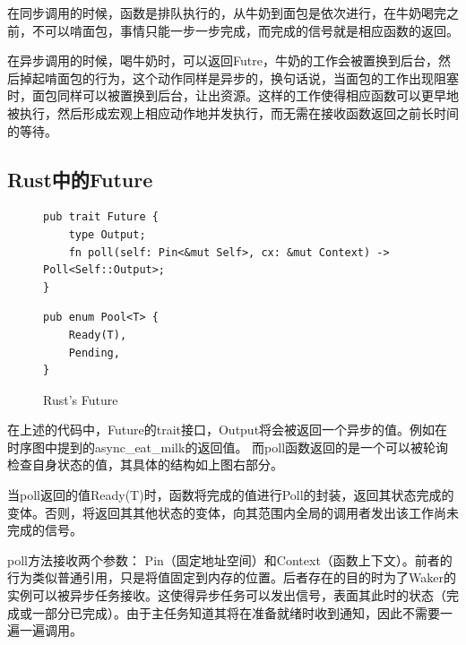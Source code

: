 在同步调用的时候，函数是排队执行的，从牛奶到面包是依次进行，在牛奶喝完之前，不可以啃面包，事情只能一步一步完成，而完成的信号就是相应函数的返回。


在异步调用的时候，喝牛奶时，可以返回Futre，牛奶的工作会被置换到后台，然后掉起啃面包的行为，这个动作同样是异步的，换句话说，当面包的工作出现阻塞时，面包同样可以被置换到后台，让出资源。这样的工作使得相应函数可以更早地被执行，然后形成宏观上相应动作地并发执行，而无需在接收函数返回之前长时间的等待。

\subsection{Rust中的Future}

\begin{figure}[htbp]
    \figureCapSet
	\centering
	\begin{minipage}{0.49\linewidth}%
		\centering
\begin{lstlisting}[frame=none]
pub trait Future {
    type Output;
    fn poll(self: Pin<&mut Self>, cx: &mut Context) -> Poll<Self::Output>;
}
\end{lstlisting}
	\end{minipage}
    \hfill
	\begin{minipage}{0.49\linewidth}
		\centering
        \begin{lstlisting}[frame=none]
pub enum Pool<T> {
    Ready(T),
    Pending,
}
        \end{lstlisting}
	\end{minipage}
    \caption{Rust's Future}
\end{figure}

在上述的代码中，Future的trait接口，Output将会被返回一个异步的值。例如在时序图中提到的async\_eat\_milk的返回值。 而poll函数返回的是一个可以被轮询检查自身状态的值，其具体的结构如上图右部分。 

当poll返回的值Ready(T)时，函数将完成的值进行Poll的封装，返回其状态完成的变体。否则，将返回其其他状态的变体，向其范围内全局的调用者发出该工作尚未完成的信号。

poll方法接收两个参数： Pin（固定地址空间）和Context（函数上下文）。前者的行为类似普通引用，只是将值固定到内存的位置。后者存在的目的时为了Waker的实例可以被异步任务接收。这使得异步任务可以发出信号，表面其此时的状态（完成或一部分已完成）。由于主任务知道其将在准备就绪时收到通知，因此不需要一遍一遍调用。

